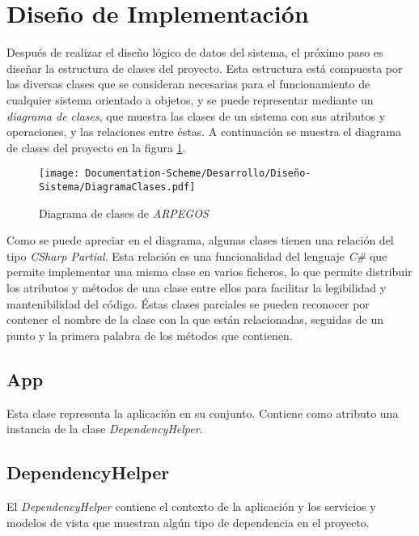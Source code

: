 
\section{Diseño de Implementación}
Después de realizar el diseño lógico de datos del sistema, el próximo paso es diseñar la estructura de clases del proyecto.
Esta estructura está compuesta por las diversas clases que se consideran necesarias para el funcionamiento de cualquier sistema 
orientado a objetos, y se puede representar mediante un \textit{diagrama de clases}, que muestra las clases de un sistema
con sus atributos y operaciones, y las relaciones entre éstas. A continuación se muestra el diagrama de clases del proyecto en 
la figura \ref*{DiagramaClases}.\medskip

\begin{figure}[H]
    \centering
    \texttt{[image: Documentation-Scheme/Desarrollo/Diseño-Sistema/DiagramaClases.pdf]}
    \caption{Diagrama de clases de \textit{ARPEGOS}}
    \label{DiagramaClases}
\end{figure}

Como se puede apreciar en el diagrama, algunas clases tienen una relación del tipo \textit{CSharp Partial}. 
Esta relación es una funcionalidad del lenguaje \textit{C\#} que permite implementar una misma clase en 
varios ficheros, lo que permite distribuir los atributos y métodos de una clase entre ellos para facilitar 
la legibilidad y mantenibilidad del código. \newpage Éstas clases parciales se pueden reconocer por contener el nombre 
de la clase con la que están relacionadas, seguidas de un punto y la primera palabra de los métodos que contienen.

\subsection{App}
Esta clase representa la aplicación en su conjunto. Contiene como atributo una instancia de la 
clase \textit{DependencyHelper}.

\subsection{DependencyHelper}
El \textit{DependencyHelper} contiene el contexto de la aplicación y los servicios y modelos de vista 
que muestran algún tipo de dependencia en el proyecto.

